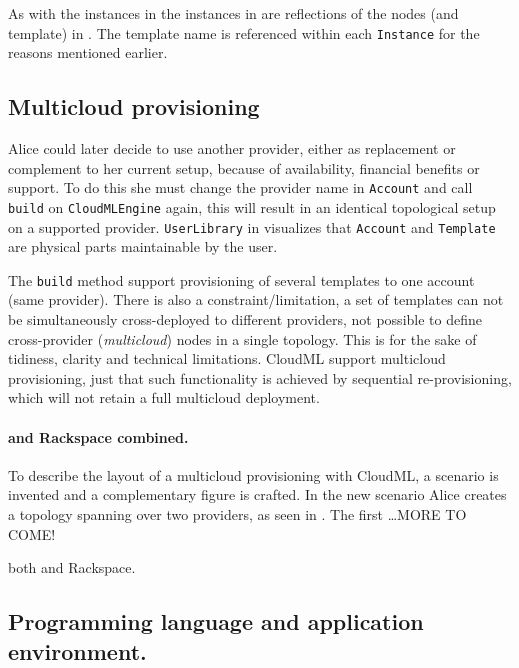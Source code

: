 As with the instances in  the instances in 
are reflections of the nodes (and template) in .
The template name is referenced within each \texttt{Instance} 
for the reasons mentioned earlier.

\subsection{Multicloud provisioning}


Alice could later decide to use another provider, either as replacement or complement to her current setup,
because of availability, financial benefits or support.
To do this she must change the provider name in \texttt{Account} and call \texttt{build} on \texttt{CloudMLEngine} again,
this will result in an identical topological setup on a supported provider.
\texttt{UserLibrary} in  visualizes that \texttt{Account} and \texttt{Template} are 
physical parts maintainable by the user.

The \texttt{build} method support provisioning of several templates to one account (same provider).
There is also a constraint/limitation, a set of templates can not be simultaneously 
cross-deployed to different providers,
\ie not possible to define cross-provider (\emph{multicloud}) nodes in a single topology.
This is for the sake of tidiness, clarity and technical limitations.
CloudML support multicloud provisioning,
just that such functionality is achieved by sequential re-provisioning,
which will not retain a full multicloud deployment.

\paragraph{ and Rackspace combined.}

To describe the layout of a multicloud provisioning with CloudML,
a scenario is invented and a complementary figure is crafted.
In the new scenario Alice creates a topology spanning over two providers,
as seen in .
The first \ldots MORE TO COME!

\ie both  and Rackspace.



\subsection{Programming language and application environment.}

